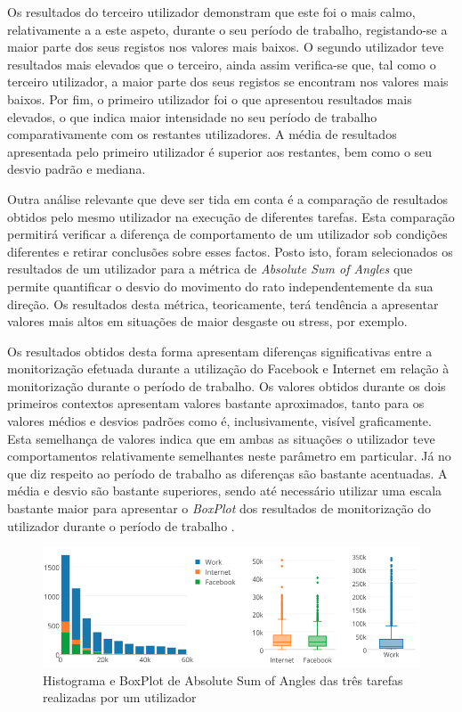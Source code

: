 Os resultados do terceiro utilizador demonstram que este foi o mais calmo, relativamente a a este aspeto, durante o seu período de trabalho, registando-se a maior parte dos seus registos nos valores mais baixos. O segundo utilizador teve resultados mais elevados que o terceiro, ainda assim verifica-se que, tal como o terceiro utilizador, a maior parte dos seus registos se encontram nos valores mais baixos. Por fim, o primeiro utilizador foi o que apresentou resultados mais elevados, o que indica maior intensidade no seu período de trabalho comparativamente com os restantes utilizadores. A média de resultados apresentada pelo primeiro utilizador é superior aos restantes, bem como o seu desvio padrão e mediana. 

Outra análise relevante que deve ser tida em conta é a comparação de resultados obtidos pelo mesmo utilizador na execução de diferentes tarefas. Esta comparação permitirá verificar a diferença de comportamento de um utilizador sob condições diferentes e retirar conclusões sobre esses factos. Posto isto, foram selecionados os resultados de um utilizador para a métrica de \textit{Absolute Sum of Angles} que permite quantificar o desvio do movimento do rato independentemente da sua direção. Os resultados desta métrica, teoricamente, terá tendência a apresentar valores mais altos em situações de maior desgaste ou stress, por exemplo.

Os resultados obtidos desta forma apresentam diferenças significativas entre a monitorização efetuada durante a utilização do Facebook e Internet em relação à monitorização durante o período de trabalho. Os valores obtidos durante os dois primeiros contextos apresentam valores bastante aproximados, tanto para os valores médios e desvios padrões como é, inclusivamente, visível graficamente. Esta semelhança de valores indica que em ambas as situações o utilizador teve comportamentos relativamente semelhantes neste parâmetro em particular. Já no que diz respeito ao período de trabalho as diferenças são bastante acentuadas. A média e desvio são bastante superiores, sendo até necessário utilizar uma escala bastante maior para apresentar o \textit{BoxPlot} dos resultados de monitorização do utilizador durante o período de trabalho . 

 \begin{figure}[htb]
   \centering
   \includegraphics[scale=0.45]{Images/absolutesumofangles.png}
   \caption{Histograma e BoxPlot de Absolute Sum of Angles das três tarefas realizadas por um utilizador}
\end{figure}

